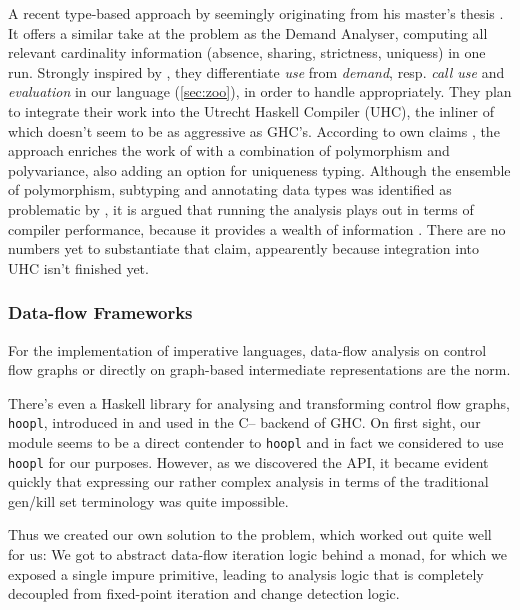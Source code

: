 A recent type-based approach by \textcite{verstoep} seemingly originating from his master's thesis \parencite{verstoepthesis}. 
It offers a similar take at the problem as the Demand Analyser, computing all relevant cardinality information (absence, sharing, strictness, uniquess) in one run.
Strongly inspired by \textcite{warnsbrough}, they differentiate \emph{use} from \emph{demand}, resp. \emph{call use} and \emph{evaluation} in our language (\cf \cref{sec:zoo}), in order to handle  appropriately.
They plan to integrate their work into the Utrecht Haskell Compiler (UHC), the inliner of which doesn't seem to be as aggressive as GHC's.
According to own claims \parencite{verstoepthesis}, the approach enriches the work of \textcite{warnsbrough} with a combination of polymorphism and polyvariance, also adding an option for uniqueness typing.
Although the ensemble of polymorphism, subtyping and annotating data types was identified as problematic by \textcite{card}, it is argued that running the analysis plays out in terms of compiler performance, because it provides a wealth of information \parencite{verstoep}.
There are no numbers yet to substantiate that claim, appearently because integration into UHC isn't finished yet.

\subsubsection{Data-flow Frameworks}

For the implementation of imperative languages, data-flow analysis on control flow graphs or directly on graph-based intermediate representations \parencite{firm} \parencite{thorin} are the norm.

There's even a Haskell library for analysing and transforming control flow graphs, \texttt{hoopl}, introduced in \textcite{hoopl} and used in the C-- backend of GHC.
On first sight, our  module seems to be a direct contender to \texttt{hoopl} and in fact we considered to use \texttt{hoopl} for our purposes.
However, as we discovered the API, it became evident quickly that expressing our rather complex analysis in terms of the traditional gen/kill set terminology was quite impossible. 

Thus we created our own solution to the problem, which worked out quite well for us:
We got to abstract data-flow iteration logic behind a  monad, for which we exposed a single impure primitive, leading to analysis logic that is completely decoupled from fixed-point iteration and change detection logic.


